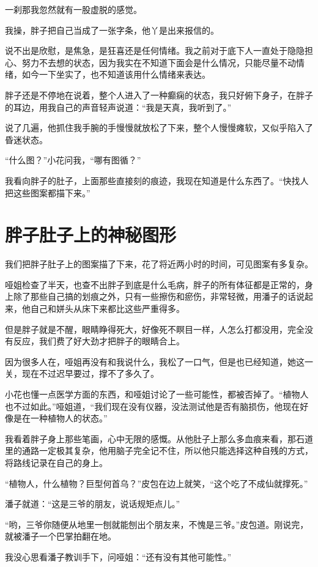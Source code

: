 一刹那我忽然就有一股虚脱的感觉。

我操，胖子把自己当成了一张字条，他丫是出来报信的。

说不出是欣慰，是焦急，是狂喜还是任何情绪。我之前对于底下人一直处于隐隐担心、努力不去想的状态，因为我实在不知道下面会是什么情况，只能尽量不动情绪，如今一下坐实了，也不知道该用什么情绪来表达。

胖子还是不停地在说着，整个人进入了一种癫痫的状态，我只好俯下身子，在胖子的耳边，用我自己的声音轻声说道：“我是天真，我听到了。”

说了几遍，他抓住我手腕的手慢慢就放松了下来，整个人慢慢瘫软，又似乎陷入了昏迷状态。

“什么图？”小花问我，“哪有图循？”

我看向胖子的肚子，上面那些直接刻的痕迹，我现在知道是什么东西了。“快找人把这些图案都描下来。”

\chapter{胖子肚子上的神秘图形}

我们把胖子肚子上的图案描了下来，花了将近两小时的时间，可见图案有多复杂。

哑姐检查了半天，也查不出胖子到底是什么毛病，胖子的所有体征都是正常的，身上除了那些自己搞的划痕之外，只有一些擦伤和瘀伤，非常轻微，用潘子的话说起来，他自己和姘头从床下来都比这些严重得多。

但是胖子就是不醒，眼睛睁得死大，好像死不瞑目一样，人怎么打都没用，完全没有反应，我们费了好大劲才把胖子的眼睛合上。

因为很多人在，哑姐再没有和我说什么，我松了一口气，但是也已经知道，她这一关，现在不过迟早要过，撑不了多久了。

小花也懂一点医学方面的东西，和哑姐讨论了一些可能性，都被否掉了。“植物人也不过如此。”哑姐道，“我们现在没有仪器，没法测试他是否有脑损伤，他现在好像是在一种植物人的状态。”

我看着胖子身上那些笔画，心中无限的感慨。从他肚子上那么多血痕来看，那石道里的通路一定极其复杂，他用脑子完全记不住，所以他只能选择这种自残的方式，将路线记录在自己的身上。

“植物人，什么植物？巨型何首乌？”皮包在边上就笑，“这个吃了不成仙就撑死。”

潘子就道：“这是三爷的朋友，说话规矩点儿。”

“哟，三爷你随便从地里一刨就能刨出个朋友来，不愧是三爷。”皮包道。刚说完，就被潘子一个巴掌拍翻在地。

我没心思看潘子教训手下，问哑姐：“还有没有其他可能性。”

